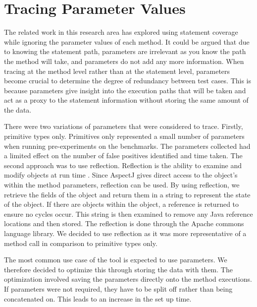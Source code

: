 \section{Tracing Parameter Values}
\label{parameterTrace}
The related work in this research area has explored using statement coverage while ignoring the parameter values of each method. It could be argued that due to knowing the statement path, parameters are irrelevant as you know the path the method will take, and parameters do not add any more information. When tracing at the method level rather than at the statement level, parameters become crucial to determine the degree of redundancy between test cases. This is because parameters give insight into the execution paths that will be taken and act as a proxy to the statement information without storing the same amount of the data.

There were two variations of parameters that were considered to trace. Firstly, primitive types only. Primitives only represented a small number of parameters when running pre-experiments on the benchmarks.  The parameters collected had a limited effect on the number of false positives identified and time taken. The second approach was to use reflection. Reflection is the ability to examine and modify objects at run time \cite{oraclereflection}. Since AspectJ gives direct access to the object's within the method parameters, reflection can be used. By using reflection, we retrieve the fields of the object and return them in a string to represent the state of the object. If there are objects within the object, a reference is returned to ensure no cycles occur. This string is then examined to remove any Java reference locations and then stored. The reflection is done through the Apache commons language library. We decided to use reflection as it was more representative of a method call in comparison to primitive types only.

The most common use case of the tool is expected to use parameters. We therefore decided to optimize this through storing the data with them. The optimization involved saving the parameters directly onto the method executions. If parameters were not required, they have to be split off rather than being concatenated on. This leads to an increase in the set up time.

